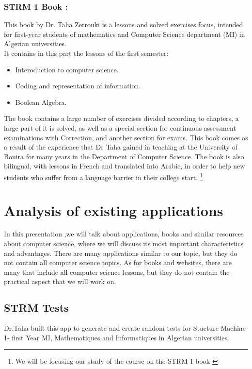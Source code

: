 \subsubsection{STRM 1 Book :}
This book by Dr. Taha Zerrouki is a lessons and solved exercises focus, intended for first-year students of mathematics and Computer Science department (MI) in 
Algerian universities.\cite{STRM-1-Book-Taha-Zerrouki}\\
It contains in this part the lessons of the first semester:
\begin{itemize}
	\item Interoduction to computer science.
	\item Coding and representation of information.
	\item Boolean Algebra.
\end{itemize}
The book contains a large number of exercises divided according to chapters, a large part of it is solved, as well as a special section for continuous assessment examinations with
Correction, and another section for exams.
This book comes as a result of the experience that Dr Taha gained in teaching at the University of Bouira for many years in the Department of Computer Science.
The book is also bilingual, with lessons in French and translated into Arabic, in order to help new students who suffer from a language barrier in their college start.
\footnote{We will be focusing our study of the course on the STRM 1 book \cite{STRM-1-Book-Taha-Zerrouki}}



 \section{Analysis of existing applications}
 In this presentation ,we will talk about applications, books and similar resources about computer science, 
 where we will discuss its most important characteristics and advantages.
 There are many applications similar to our topic, but they do not contain all computer science topics.
 As for books and websites, there are many that include all computer science lessons, but they do not 
 contain the practical aspect that we will work on.
 

 \subsection{STRM Tests}
 Dr.Taha built this app to generate and create random tests for Stucture Machine 1- first Year MI, Mathematiques and Informatiques
  in Algerian universities.\cite{STRM-Tests}
 
